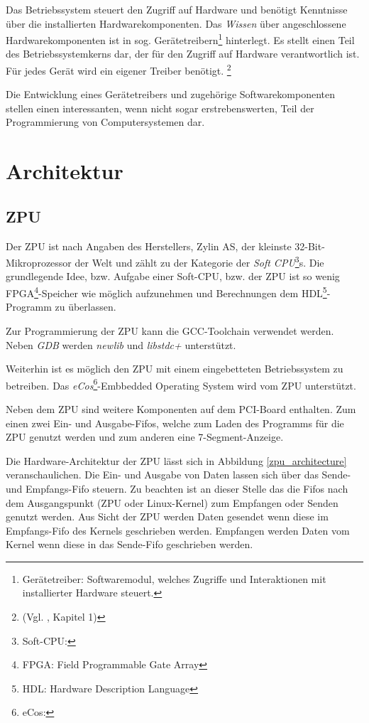 \documentclass[11pt]{scrartcl}
\begin{document}
Das Betriebssystem steuert den Zugriff auf Hardware und benötigt Kenntnisse über die installierten Hardwarekomponenten. Das \textit{Wissen} über angeschlossene Hardwarekomponenten ist in sog. Gerätetreibern\footnote{Gerätetreiber: Softwaremodul, welches Zugriffe und Interaktionen mit installierter Hardware steuert.} hinterlegt. Es stellt einen Teil des Betriebssystemkerns dar, der für den Zugriff auf Hardware verantwortlich ist. Für jedes Gerät wird ein eigener Treiber benötigt. \footnote{(Vgl. \cite{ltp_book}, Kapitel 1)}

Die Entwicklung eines Gerätetreibers und zugehörige Softwarekomponenten stellen einen interessanten, wenn nicht sogar erstrebenswerten, Teil der Programmierung von Computersystemen dar.

\pagebreak

\section{Architektur}
 
\subsection{ZPU}


Der ZPU ist nach Angaben des Herstellers, Zylin AS, der kleinste 32-Bit-Mikroprozessor der Welt und zählt zu der Kategorie der \textit{Soft CPU}\footnote{Soft-CPU:}s. Die grundlegende Idee, bzw. Aufgabe einer Soft-CPU, bzw. der ZPU ist so wenig FPGA\footnote{FPGA: Field Programmable Gate Array}-Speicher wie möglich aufzunehmen und Berechnungen dem HDL\footnote{HDL: Hardware Description Language}-Programm zu überlassen.

Zur Programmierung der ZPU kann die GCC-Toolchain verwendet werden. Neben \textit{GDB} werden \textit{newlib} und \textit{libstdc+} unterstützt.

Weiterhin ist es möglich den ZPU mit einem eingebetteten Betriebssystem zu betreiben. Das \textit{eCos}\footnote{eCos:}-Embbedded Operating System wird vom ZPU unterstützt. 

Neben dem ZPU sind weitere Komponenten auf dem PCI-Board enthalten. Zum einen zwei Ein- und Ausgabe-Fifos, welche zum Laden des Programms für die ZPU genutzt werden und zum anderen eine 7-Segment-Anzeige.

Die Hardware-Architektur der ZPU lässt sich in Abbildung \ref{zpu_architecture} veranschaulichen. 
Die Ein- und Ausgabe von Daten lassen sich über das Sende- und Empfangs-Fifo steuern. Zu beachten ist an dieser Stelle das die Fifos nach dem Ausgangspunkt (ZPU oder Linux-Kernel) zum Empfangen oder Senden genutzt werden. Aus Sicht der ZPU werden Daten gesendet wenn diese im Empfangs-Fifo des Kernels geschrieben werden. Empfangen werden Daten vom Kernel wenn diese in das Sende-Fifo geschrieben werden. 
\end{document}

